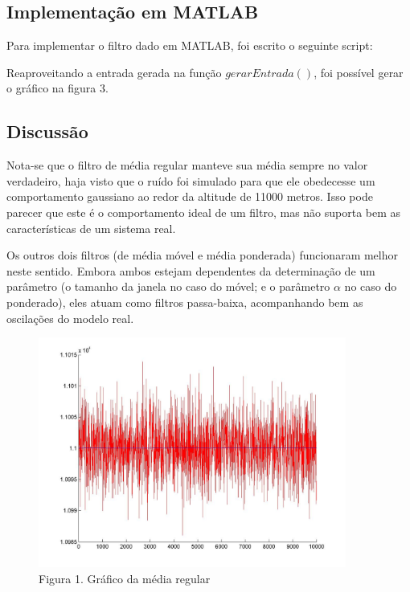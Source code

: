 \documentclass[12pt, a4paper, twoside]{article}
\begin{document}
\subsection{Implementação em MATLAB}

Para implementar o filtro dado em MATLAB, foi escrito o seguinte script:



Reaproveitando a entrada gerada na função $gerarEntrada()$, foi possível gerar o gráfico na figura 3.

\subsection{Discussão}

Nota-se que o filtro de média regular manteve sua média sempre no valor verdadeiro, haja visto que o ruído foi simulado para que ele obedecesse um comportamento gaussiano ao redor da altitude de 11000 metros. Isso pode parecer que este é o comportamento ideal de um filtro, mas não suporta bem as características de um sistema real.

Os outros dois filtros (de média móvel e média ponderada) funcionaram melhor neste sentido. Embora ambos estejam dependentes da determinação de um parâmetro (o tamanho da janela no caso do móvel; e o parâmetro $\alpha$ no caso do ponderado), eles atuam como filtros passa-baixa, acompanhando bem as oscilações do modelo real.

\begin{figure}
  \includegraphics[width=0.9\textwidth]{mediaregular.jpg}
  \caption{Figura 1. Gráfico da média regular}
\end{figure}
\end{document}

